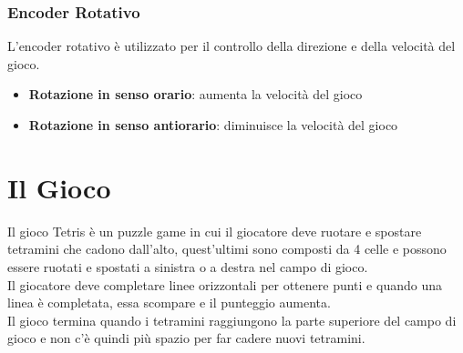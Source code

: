\documentclass[a4paper, 12pt]{article}
\begin{document}
\subsubsection{Encoder Rotativo}
L'encoder rotativo è utilizzato per il controllo della direzione e della velocità del gioco.\\
\begin{itemize}
    \item \textbf{Rotazione in senso orario}: aumenta la velocità del gioco
    \item \textbf{Rotazione in senso antiorario}: diminuisce la velocità del gioco
\end{itemize}

\section{Il Gioco}
Il gioco Tetris è un puzzle game in cui il giocatore deve ruotare e spostare tetramini che cadono dall'alto, quest'ultimi sono composti da 
4 celle e possono essere ruotati e spostati a sinistra o a destra nel campo di gioco.\\
Il giocatore deve completare linee orizzontali per ottenere punti e quando una linea è completata, essa scompare e il punteggio aumenta.\\
Il gioco termina quando i tetramini raggiungono la parte superiore del campo di gioco e non c'è quindi più spazio per far cadere nuovi tetramini.\\
\end{document}
